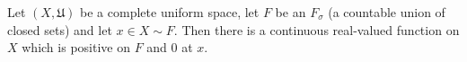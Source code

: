 Let $(X, \mathfrak{U})$ be a complete uniform space, let $F$ be an $F_{\sigma}$ (a countable union of closed sets) and let $x \in X \sim F$. Then there is a continuous real-valued function on $X$ which is positive on $F$ and $0$ at $x$.
